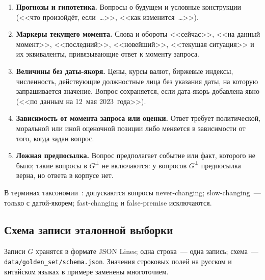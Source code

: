 \documentclass{article}
\newcommand{\refuse}{\bot}                          %
\begin{document}
\begin{enumerate}
  \item[$E_1$] \textbf{Прогнозы и гипотетика.} Вопросы о будущем и условные конструкции (<<что произойдёт, если~\dots>>, <<как изменится~\dots>>).
  \item[$E_2$] \textbf{Маркеры текущего момента.} Слова и обороты <<сейчас>>, <<на данный момент>>, <<последний>>, <<новейший>>, <<текущая ситуация>> и их эквиваленты, привязывающие ответ к моменту запроса.
  \item[$E_3$] \textbf{Величины без даты-якоря.} Цены, курсы валют, биржевые индексы, численность, действующие должностные лица без указания даты, на которую запрашивается значение. Вопрос сохраняется, если дата-якорь добавлена явно (<<по данным на 12~мая 2023~года>>).
  \item[$E_4$] \textbf{Зависимость от момента запроса или оценки.} Ответ требует политической, моральной или иной оценочной позиции либо меняется в зависимости от того, когда задан вопрос.
  \item[$E_5$] \textbf{Ложная предпосылка.} Вопрос предполагает событие или факт, которого не было; такие вопросы в $G^{\refuse}$ не включаются: у вопросов $G^{\refuse}$ предпосылка верна, но ответа в корпусе нет.
\end{enumerate}

В терминах таксономии~\cite{vu2023freshllms}: допускаются вопросы never-changing; slow-changing~--- только с датой-якорем; fast-changing и false-premise исключаются.

\subsection{Схема записи эталонной выборки}\label{app:schema}

Записи $G$ хранятся в формате JSON Lines; одна строка~--- одна запись; схема~--- \texttt{data/golden\_set/schema.json}. Значения строковых полей на русском и китайском языках в примере заменены многоточием.
\end{document}
